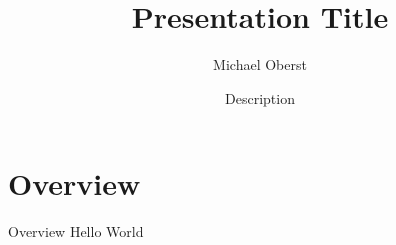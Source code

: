 \documentclass[fontsize=10pt, pdf]{beamer}
\title{Presentation Title}
\author{Michael Oberst}
\date[Forum]{Description}
\begin{document}
\begin{frame}
 \titlepage 
\end{frame}

\section{Overview}
\label{sec:overview}

\begin{frame}{Overview}
  Hello World
\end{frame}
\end{document}
